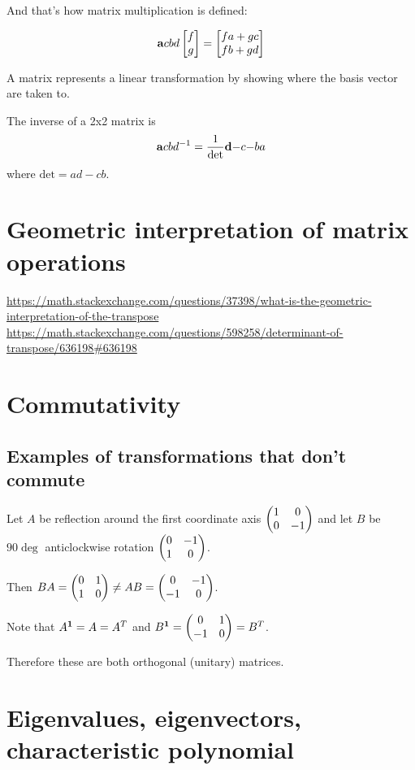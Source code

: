 And that's how matrix multiplication is defined:

$$
\mathbf{a}{c}
    {b}{d} \begin{bmatrix}f\\g\end{bmatrix} = \begin{bmatrix}fa + gc\\fb + gd\end{bmatrix}
$$


A matrix represents a linear transformation by showing where the basis vector
are taken to.

\begin{theorem}
  The inverse of a 2x2 matrix is
  \begin{align*}
   \mathbf{a}{c}
       {b}{d}^{-1}
  =
  \frac{1}{\text{det}} \mathbf{d }{-c}
                           {-b}{a}
  \end{align*}
  where $\text{det} = ad - cb$.
\end{theorem}

\section{Geometric interpretation of matrix operations}
\url{https://math.stackexchange.com/questions/37398/what-is-the-geometric-interpretation-of-the-transpose}
\url{https://math.stackexchange.com/questions/598258/determinant-of-transpose/636198#636198}


\section{Commutativity}
\subsection{Examples of transformations that don't commute}
Let $A$ be reflection around the first coordinate axis $\begin{pmatrix}1 & 0\\0 & -1\\ \end{pmatrix}$
and let $B$ be $90\deg$ anticlockwise rotation $\begin{pmatrix}0 & -1\\1 & 0\\ \end{pmatrix}$.

Then $BA = \begin{pmatrix}0 & 1\\1 & 0\\ \end{pmatrix}
\neq  AB = \begin{pmatrix}0 & -1\\-1 & 0\\ \end{pmatrix}$.

Note that $A^{\mathbf 1} = A = A^T$ and $B^{\mathbf 1} = \begin{pmatrix}0 & 1\\-1 & 0\\ \end{pmatrix} = B^T$.

Therefore these are both orthogonal (unitary) matrices.


\section{Eigenvalues, eigenvectors, characteristic polynomial}

